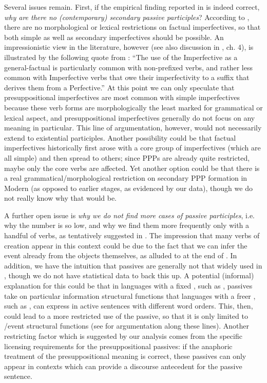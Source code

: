 \documentclass[output=paper,modfonts,newtxmath,hidelinks
\ChapterDOI{10.5281/zenodo.2545513}
]{langscibook}
\begin{document}
Several issues remain. First, if the empirical finding reported in  is indeed correct, \textit{why are there no (contemporary) secondary   passive participles}? According to \citet{gronndiss}, there are no morphological or lexical restrictions on factual imperfectives, so that both simple as well as secondary imperfectives should be possible. An impressionistic view in the literature, however (see also discussion in \citealt{gronndiss}, ch. 4), is illustrated by the following quote from \citet[][118]{comrie76}: ``The use of the Imperfective as a general-factual is particularly common with non-prefixed verbs, and rather less common with Imperfective verbs that owe their imperfectivity to a suffix that derives them from a Perfective.'' At this point we can only speculate that presuppositional imperfectives are most common with simple imperfectives because these verb forms are morphologically the least marked for grammatical or lexical aspect, and presuppositional imperfectives  generally do not focus on any  meaning in particular. This line of argumentation, however, would not necessarily extend to existential  participles. Another possibility could be that factual imperfectives historically first arose with a core group of imperfectives (which are all simple) and then spread to others; since  PPPs are already quite restricted, maybe only the core verbs are affected. Yet another option could be that there is a real grammatical/morphological restriction on secondary  PPP formation in Modern  (as opposed to earlier stages, as evidenced by our data), though we do not really know why that would be.

A further open issue is \textit{why we do not find more cases of   passive participles}, i.e. why the number is so low, and why we find them more frequently only with a handful of verbs, as tentatively suggested in . The impression that many verbs of creation appear in this context could be due to the fact that we can infer the event already from the objects themselves, as alluded to at the end of . In addition, we have the intuition that passives are generally not that widely used in , though we do not have statistical data to back this up. A potential (informal) explanation for this could be that in languages with a fixed , such as , passives take on particular information structural functions that languages with a freer , such as , can express in active sentences with different word orders. This, then, could lead to a more restricted use of the passive, so that it is only limited to /event structural functions (see \citealt{abraham06} for argumentation along these lines). Another restricting factor which is suggested by our analysis comes from the specific licensing requirements for the presuppositional  passives: if the anaphoric treatment of the presuppositional meaning is correct, these passives can only appear in contexts which can provide a discourse antecedent for the passive sentence.
\end{document}
